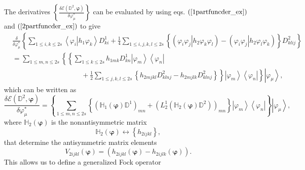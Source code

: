 \documentclass[aps,preprint]{revtex4}%
\begin{document}
The derivatives $\left\{  \frac{\delta\mathcal{E}\left(  \mathbb{D}%
^{2},\bm{\varphi}\right)  }{\delta\varphi_{\mu}^{\ast}}\right\}  $ can be
evaluated by using eqs. $\left(  \ref{1partfuncder_ex}\right)  $ and $\left(
\ref{2partfuncder_ex}\right)  $ to give
\begin{align}
&  \frac{\delta}{\delta\varphi_{\mu}^{\ast}}\left\{  \sum_{1\leq i,k\leq
2s}\left\langle \left.  \varphi_{i}\right\vert h_{1}\varphi_{k}\right\rangle
D_{ki}^{1}+\frac{1}{4}\sum_{1\leq i,j,k,l\leq2s}\left\{  \left(  \left.
\varphi_{i}\varphi_{j}\right\vert h_{2}\varphi_{k}\varphi_{l}\right)  -\left(
\left.  \varphi_{i}\varphi_{j}\right\vert h_{2}\varphi_{l}\varphi_{k}\right)
\right\}  D_{klij}^{2}\right\} \nonumber\\
&  =\sum_{1\leq m,n\leq2s}\left\{  \left\{  \sum_{1\leq k\leq2s}h_{1mk}%
D_{kn}^{1}\left\vert \varphi_{m}\right\rangle \left\langle \varphi
_{n}\right\vert \right.  \right. \nonumber\\
&  \qquad\qquad\qquad\qquad\qquad+\left.  \left.  \frac{1}{2}\sum_{1\leq
j,k,l\leq2s}\left\{  h_{2mjkl}D_{klnj}^{2}-h_{2mjlk}D_{klnj}^{2}\right\}
\right\}  \left\vert \varphi_{m}\right\rangle \left\langle \varphi
_{n}\right\vert \right\}  \left\vert \varphi_{\mu}\right\rangle ,
\end{align}
which can be written as
\begin{equation}
\frac{\delta\mathcal{E}\left(  \mathbb{D}^{2},\bm{\varphi}\right)  }%
{\delta\varphi_{\mu}^{\ast}}=\left\{  \sum_{1\leq m,n\leq2s}\left\{  \left(
\mathbb{H}_{1}\left(  \bm{\varphi}\right)  \mathbb{D}^{1}\right)
_{mn}+\left(  L_{2}^{1}\left(  \mathbb{H}_{2}\left(  \bm{\varphi}\right)
\mathbb{D}^{2}\right)  \right)  _{mn}\right\}  \left\vert \varphi
_{m}\right\rangle \left\langle \varphi_{n}\right\vert \right\}  \left\vert
\varphi_{\mu}\right\rangle ,
\end{equation}
where $\mathbb{H}_{2}\left(  \bm{\varphi}\right)  $ is the nonantisymmetric
matrix
\begin{equation}
\mathbb{H}_{2}\left(  \bm{\varphi}\right)  \leftrightarrow\left\{
h_{2ijkl}\right\}  ,
\end{equation}
that determine the antisymmetric matrix elements
\begin{equation}
V_{2ijkl}\left(  \bm{\varphi}\right)  =\left(  h_{2ijkl}\left(
\bm{\varphi}\right)  -h_{2ijlk}\left(  \bm{\varphi}\right)  \right)  .
\end{equation}
This allows us to define a generalized Fock operator
\end{document}
